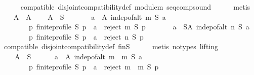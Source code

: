 \begin{isabellebody}
\ \ \ \ \isamarkupfalse%
\ compatible\ disjoint{\isacharunderscore}{\kern0pt}compatibility{\isacharunderscore}{\kern0pt}def\ module{\isacharunderscore}{\kern0pt}m{}\ seq{\isacharunderscore}{\kern0pt}comp{\isacharunderscore}{\kern0pt}sound\isanewline
\ \ \ \ \isamarkupfalse%
\ metis\isanewline
\ \ \isamarkupfalse%
\ A\ \ A{\isacharcolon}{\kern0pt}\isanewline
\ \ \ \ {\isachardoublequoteopen}A\ {\isasymsubseteq}\ S\ {\isasymand}\isanewline
\ \ \ \ \ \ {\isacharparenleft}{\kern0pt}{\isasymforall}a\ {\isasymin}\ A{\isachardot}{\kern0pt}\ indep{\isacharunderscore}{\kern0pt}of{\isacharunderscore}{\kern0pt}alt\ m\ S\ a\ {\isasymand}\isanewline
\ \ \ \ \ \ \ \ {\isacharparenleft}{\kern0pt}{\isasymforall}p{\isachardot}{\kern0pt}\ finite{\isacharunderscore}{\kern0pt}profile\ S\ p\ {\isasymlongrightarrow}\ a\ {\isasymin}\ reject\ m\ S\ p{\isacharparenright}{\kern0pt}{\isacharparenright}{\kern0pt}\ {\isasymand}\isanewline
\ \ \ \ \ \ {\isacharparenleft}{\kern0pt}{\isasymforall}a\ {\isasymin}\ S{\isacharminus}{\kern0pt}A{\isachardot}{\kern0pt}\ indep{\isacharunderscore}{\kern0pt}of{\isacharunderscore}{\kern0pt}alt\ n\ S\ a\ {\isasymand}\isanewline
\ \ \ \ \ \ \ \ {\isacharparenleft}{\kern0pt}{\isasymforall}p{\isachardot}{\kern0pt}\ finite{\isacharunderscore}{\kern0pt}profile\ S\ p\ {\isasymlongrightarrow}\ a\ {\isasymin}\ reject\ n\ S\ p{\isacharparenright}{\kern0pt}{\isacharparenright}{\kern0pt}{\isachardoublequoteclose}\isanewline
\ \ \ \ \isamarkupfalse%
\ compatible\ disjoint{\isacharunderscore}{\kern0pt}compatibility{\isacharunderscore}{\kern0pt}def\ fin{\isacharunderscore}{\kern0pt}S\isanewline
\ \ \ \ \isamarkupfalse%
\ {\isacharparenleft}{\kern0pt}metis\ {\isacharparenleft}{\kern0pt}no{\isacharunderscore}{\kern0pt}types{\isacharcomma}{\kern0pt}\ lifting{\isacharparenright}{\kern0pt}{\isacharparenright}{\kern0pt}\isanewline
\ \ \isamarkupfalse%
\isanewline
\ \ \ \ {\isachardoublequoteopen}{\isasymexists}A\ {\isasymsubseteq}\ S{\isachardot}{\kern0pt}\isanewline
\ \ \ \ \ \ {\isacharparenleft}{\kern0pt}{\isasymforall}a\ {\isasymin}\ A{\isachardot}{\kern0pt}\ indep{\isacharunderscore}{\kern0pt}of{\isacharunderscore}{\kern0pt}alt\ {\isacharparenleft}{\kern0pt}m\ {\isasymtriangleright}\ m{}{\isacharparenright}{\kern0pt}\ S\ a\ {\isasymand}\isanewline
\ \ \ \ \ \ \ \ {\isacharparenleft}{\kern0pt}{\isasymforall}p{\isachardot}{\kern0pt}\ finite{\isacharunderscore}{\kern0pt}profile\ S\ p\ {\isasymlongrightarrow}\ a\ {\isasymin}\ reject\ {\isacharparenleft}{\kern0pt}m\ {\isasymtriangleright}\ m{}{\isacharparenright}{\kern0pt}\ S\ p{\isacharparenright}{\kern0pt}{\isacharparenright}{\kern0pt}\ {\isasymand}\isanewline

\end{isabellebody}
